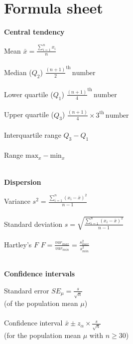 \section{Formula sheet}
\label{formulasheet}

\begin{minipage}[t]{.45\textwidth}
\begin{center}
    \textbf{Central tendency}
\end{center}
\hline
\answerskip
Mean \hfill $\bar{x} = \frac{\sum^n_{i = 1} x_i}{n}$ \\
\\
Median ($Q_2$) \hfill $\frac{(n + 1)}{2}^{\text{th}} \, \text{number}$ \\
\\
Lower quartile ($Q_1$) \hfill $\frac{(n + 1)}{4}^{\text{th}} \, \text{number}$ \\
\\
Upper quartile ($Q_3$) \hfill $\frac{(n + 1)}{4} \times 3^{\text{th}} \, \text{number}$ \\
\\
Interquartile range \hfill $Q_3 - Q_1$ \\
\\
Range \hfill $\text{max}_x - \text{min}_x$ \\
\\
\begin{center}
    \textbf{Dispersion}
\end{center}
\hline
\answerskip
Variance \hfill $s^2 = \frac{\sum^n_{i = 1} (x_i - \bar{x})^2}{n - 1}$ \\
\\
Standard deviation \hfill $s = \sqrt{\frac{\sum^n_{i = 1} (x_i - \bar{x})^2}{n - 1}}$ \\
\\
Hartley's $F$ \hfill $F = \frac{var_{max}}{var_{min}} = \frac{s^2_{max}}{s^2_{min}}$\\
\\
\begin{center}
    \textbf{Confidence intervals}
\end{center}
\hline
\answerskip
Standard error \hfill $SE_\mu = \frac{s}{\sqrt{n}}$ \\
{\scriptsize (of the population mean $\mu$)}\\
\\
Confidence interval \hfill $\bar{x} \pm z_\alpha \times \frac{s}{\sqrt{n}}$ \\
{\scriptsize (for the population mean $\mu$ with $n \geq 30$)}\\

\end{minipage}
